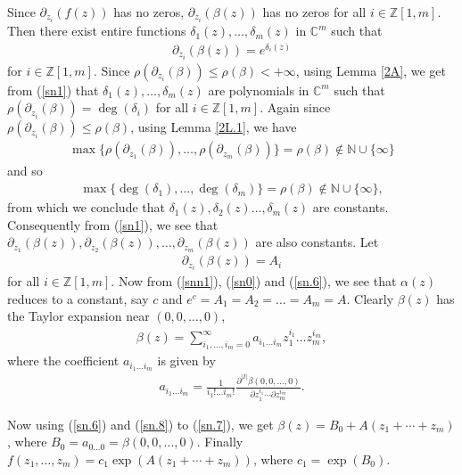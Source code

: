 \documentclass[11pt, reqno]{amsart}
\numberwithin{equation}{section}
\begin{document}
Since $\partial_{z_i}(f(z))$ has no zeros, $\partial_{z_i}(\beta(z))$ has no zeros for all $i\in\mathbb{Z}[1,m]$. 
Then there exist entire functions $\delta_1(z),\ldots, \delta_m(z)$ in $\mathbb{C}^m$ such that 
\begin{align}\label{sn1}
\partial_{z_i}(\beta(z))=e^{\delta_i(z)}
\end{align}
for $i\in\mathbb{Z}[1,m]$. Since $\rho(\partial_{z_i}(\beta))\leq \rho(\beta)<+\infty$, using Lemma \ref{2A}, we get from (\ref{sn1}) that $\delta_1(z),\ldots,\delta_m(z)$ are polynomials in $\mathbb{C}^m$ such that $\rho(\partial_{z_i}(\beta))=\deg(\delta_i)$
for all $i\in\mathbb{Z}[1,m]$. Again since $\rho(\partial_{z_i}(\beta))\leq \rho(\beta)$, using Lemma \ref{2L.1}, we have
\begin{align*}
\max\{\rho(\partial_{z_1}(\beta)),\ldots,\rho(\partial_{z_m}(\beta))\}= \rho(\beta)\not\in\mathbb{N}\cup\{\infty\}
\end{align*}
and so
\begin{align*}
\max\{\deg(\delta_1),\ldots,\deg(\delta_m)\}=\rho(\beta)\not\in\mathbb{N}\cup\{\infty\},
\end{align*}
from which we conclude that $\delta_1(z),\delta_2(z)\ldots,\delta_m(z)$ are constants. Consequently from (\ref{sn1}), we see that 
$\partial_{z_1}(\beta(z)), \partial_{z_2}(\beta(z)),\ldots, \partial_{z_m}(\beta(z))$ are also constants. Let
\begin{align}\label{sn.6} 
\partial_{z_i}(\beta(z))=A_i
\end{align}
for all $i\in\mathbb{Z}[1,m]$. Now from (\ref{snn1}), (\ref{sn0}) and (\ref{sn.6}), we see that $\alpha(z)$ reduces to a constant, say $c$ and $e^c=A_1=A_2=\ldots=A_m=A$. Clearly $\beta(z)$ has the Taylor expansion near $(0,0,\ldots,0)$,
\begin{align}\label{sn.7} 
\beta(z)=\sum\limits_{i_1,\ldots,i_m=0}^{\infty} a_{i_1\ldots i_m} z_1^{i_1}\ldots z_m^{i_m},
\end{align}
where the coefficient $a_{i_1\ldots i_m}$ is given by
\begin{align}\label{sn.8} 
a_{i_1\ldots i_m}=\frac{1}{i_1!\ldots i_m!}\frac{\partial^{|I|}\beta(0,0,\ldots,0)}{\partial z_1^{i_1}\cdots \partial z_m^{i_m}}.
\end{align}

Now using (\ref{sn.6}) and (\ref{sn.8}) to (\ref{sn.7}), we get $\beta(z)=B_0+A(z_1+ \cdots+z_m)$,
where $B_0=a_{0\ldots 0}=\beta(0,0,\ldots,0)$. Finally $f(z_1,\ldots ,z_m)=c_1\exp(A(z_1+ \cdots+z_m))$,
where $c_1=\exp(B_0)$.
\end{document}
